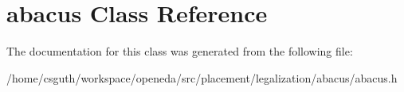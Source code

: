 \hypertarget{classabacus}{\section{abacus Class Reference}
\label{classabacus}
}


The documentation for this class was generated from the following file\-:\begin{DoxyCompactItemize}
\item 
/home/csguth/workspace/openeda/src/placement/legalization/abacus/abacus.\-h\end{DoxyCompactItemize}
